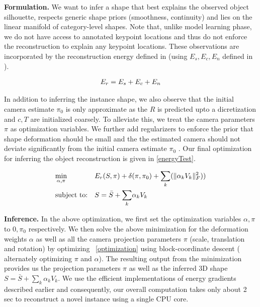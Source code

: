 \vspace{3mm}
\noindent \textbf{Formulation.}
We want to infer a shape that best explains the observed object silhouette, respects generic shape priors (smoothness, continuity) and lies on the linear manifold of category-level shapes. Note that, unlike model learning phase, we do not have access to annotated keypoint locations and thus do not enforce the reconstruction to explain any keypoint locations. These observations are incorporated by the reconstruction energy defined in  (using $E_{s},E_{c},E_{n}$ defined in ).

\begin{gather}
 \eqlabel{testRecon}E_{r} = E_{s} + E_{c} + E_{n}
\end{gather}

In addition to inferring the instance shape, we also observe that the initial camera estimate $\pi_0$ is only approximate as the $R$ is predicted upto a dicretization and $c,T$ are initialized coarsely. To alleviate this, we treat the camera parameters $\pi$ as optimization variables.  We further add regularizers to enforce the prior that shape deformation should be small and the the estimated camera should not deviate significantly from the initial camera estimate $\pi_0$ . Our final optimization for inferring the object reconstruction is given in \eqref{energyTest}.

\begin{equation}
\begin{aligned}
\eqlabel{energyTest}
& \underset{\alpha,\pi}{\text{min}}
& & E_{r}(S,\pi) + \delta(\pi,\pi_0) +\underset{k}{\sum}(\|\alpha_{k}V_k\|_F^{2})) \\
& \text{subject to:}
& & S = \bar{S} + \underset{k}{\sum}\alpha_{k} V_k
\end{aligned}
\end{equation}

\vspace{3mm}
\noindent \textbf{Inference.} In the above optimization,  we first set the optimization variables $\alpha,\pi$ to $0,\pi_0$ respectively.  We then solve the above minimization for the deformation weights $\alpha$ as well as all the camera projection parameters $\pi$ (scale, translation and rotation) by optimizing ~\eqref{optimization}  using block-coordinate descent ( alternately optimizing $\pi$ and $\alpha$). The resulting output from the minimization provides us the projection parameters $\pi$ as well as the inferred 3D shape $S = \bar{S} + \underset{k}{\sum}\alpha_{k} V_k$. We use the efficient implementations of energy gradients described earlier and consequently, our overall computation takes only about 2 sec to reconstruct a novel instance using a single CPU core.

